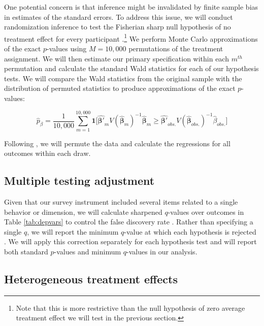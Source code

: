 \documentclass[11pt, a4paper]{article}\usepackage[]{graphicx}\usepackage[]{color}
\begin{document}
        One potential concern is that inference might be invalidated by finite sample bias in estimates of the standard errors. To address this issue, we will conduct randomization inference to test the Fisherian sharp null hypothesis of no treatment effect for every participant \parencite{fisher_design_1935}.\footnote{Note that this is more restrictive than the null hypothesis of zero average treatment effect we will test in the previous section.} We perform Monte Carlo approximations of the exact $p$-values using $M=10,000$ permutations of the treatment assignment. We will then estimate our primary specification within each $m^{th}$ permutation and calculate the standard Wald statistics for each of our hypothesis tests. We will compare the Wald statistics from the original sample with the distribution of permuted statistics to produce approximations of the exact $p$-values:

        \begin{equation} \label{eq:exactp}
            \hat{p}_{\beta} =  \frac{1}{10,000}\sum_{m=1}^{10,000} \mathbf{1} \Big [ \mathbf{\hat{\beta'}}_m V(\mathbf{\hat{\beta}}_m)^{-1} \mathbf{\hat{\beta}}_m \geq \mathbf{\hat{\beta'}}_{obs.} V(\mathbf{\hat{\beta}}_{obs.})^{-1} \hat{\beta}_{obs.} \Big ]
        \end{equation}

        Following \textcite{young_channeling_2015}, we will permute the data and calculate the regressions for all outcomes within each draw.

    \subsection{Multiple testing adjustment}

        Given that our survey instrument included several items related to a single behavior or dimension, we will calculate sharpened $q$-values over outcomes in Table \ref{tab:depvars} to control the false discovery rate \parencite{benjamini_adaptive_2006}. Rather than specifying a single $q$, we will report the minimum $q$-value at which each hypothesis is rejected \parencite{anderson_multiple_2008}. We will apply this correction separately for each hypothesis test and will report both standard $p$-values and minimum $q$-values in our analysis.

    \subsection{Heterogeneous treatment effects}
\end{document}
